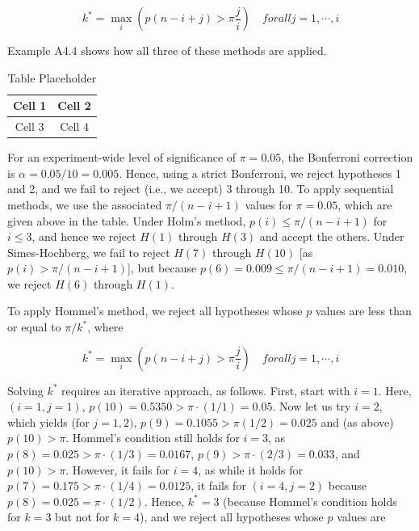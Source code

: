 \documentclass{article}
\begin{document}
\begin{equation}
k^{*}=\max_{i}\left(p(n-i+j)>\pi\frac{j}{i}\right)\quad for all j=1,\cdots,i
\end{equation}

Example A4.4 shows how all three of these methods are applied.

\begin{table}[h]
\centering
\begin{tabular}{|c|c|}
\hline
Cell 1 & Cell 2 \\
\hline
Cell 3 & Cell 4 \\
\hline
\end{tabular}
\caption{Table Placeholder}
\end{table}

For an experiment-wide level of significance of  $ \pi = 0.05 $, the Bonferroni correction is  $ \alpha = 0.05 / 10 = 0.005 $. Hence, using a strict Bonferroni, we reject hypotheses 1 and 2, and we fail to reject (i.e., we accept) 3 through 10. To apply sequential methods, we use the associated  $ \pi/(n-i+1) $ values for  $ \pi = 0.05 $, which are given above in the table. Under Holm's method,  $ p(i) \leq \pi/(n-i+1) $ for  $ i \leq 3 $, and hence we reject  $ H(1) $ through  $ H(3) $ and accept the others. Under Simes-Hochberg, we fail to reject  $ H(7) $ through  $ H(10) $ [as  $ p(i) > \pi/(n-i+1) $], but because  $ p(6) = 0.009 \leq \pi/(n-i+1) = 0.010 $, we reject  $ H(6) $ through  $ H(1) $.

To apply Hommel's method, we reject all hypotheses whose $p$ values are less than or equal to $\pi/k^{*}$, where

\begin{equation}
k^{*}=\max_{i}\left(p(n-i+j)>\pi\frac{j}{i}\right)\quad for all j=1,\cdots,i
\end{equation}

Solving $k^{*}$ requires an iterative approach, as follows. First, start with $i = 1$. Here, $(i = 1, j = 1)$, $p(10) = 0.5350 > \pi \cdot (1/1) = 0.05$. Now let us try $i = 2$, which yields (for $j = 1, 2)$, $p(9) = 0.1055 > \pi(1/2) = 0.025$ and (as above) $p(10) > \pi$. Hommel's condition still holds for $i = 3$, as $p(8) = 0.025 > \pi \cdot (1/3) = 0.0167$, $p(9) > \pi \cdot (2/3) = 0.033$, and $p(10) > \pi$. However, it fails for $i = 4$, as while it holds for $p(7) = 0.175 > \pi \cdot (1/4) = 0.0125$, it fails for $(i = 4, j = 2)$ because $p(8) = 0.025 = \pi \cdot (1/2)$. Hence, $k^{*} = 3$ (because Hommel's condition holds for $k = 3$ but not for $k = 4$), and we reject all hypotheses whose $p$ values are
\end{document}
